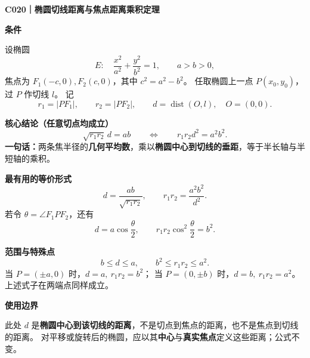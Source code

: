 \begin{statementbox}
\textbf{\textcolor{CStatement}{C020｜椭圆切线距离与焦点距离乘积定理}}

\medskip
\textbf{\textcolor{CStatement}{条件}}\par
设椭圆
\[
E:\quad \frac{x^2}{a^2}+\frac{y^2}{b^2}=1,\qquad a>b>0,
\]
焦点为 $F_1(-c,0),F_2(c,0)$，其中 $c^2=a^2-b^2$。
任取椭圆上一点 $P(x_0,y_0)$，过 $P$ 作切线 $l$。
记
\[
r_1=|PF_1|,\qquad r_2=|PF_2|,\qquad
 d=\operatorname{dist}(O,l),\quad O=(0,0).
\]

\textbf{\textcolor{CStatement}{核心结论（任意切点均成立）}}
\[
\boxed{\sqrt{r_1r_2}\,d=ab}\qquad\Longleftrightarrow\qquad
\boxed{r_1r_2d^2=a^2b^2}.
\]
\textbf{一句话：}两条焦半径的\textbf{几何平均数}，乘以\textbf{椭圆中心到切线的垂距}，等于半长轴与半短轴的乘积。

\medskip
\textbf{\textcolor{CStatement}{最有用的等价形式}}
\[
\boxed{d=\frac{ab}{\sqrt{r_1r_2}}},\qquad
\boxed{r_1r_2=\frac{a^2b^2}{d^2}}.
\]
若令 $\theta=\angle F_1PF_2$，还有
\[
\boxed{d=a\cos\frac{\theta}{2}},\qquad
\boxed{r_1r_2\cos^2\frac{\theta}{2}=b^2}.
\]

\textbf{\textcolor{CStatement}{范围与特殊点}}
\[
b\le d\le a,\qquad b^2\le r_1r_2\le a^2.
\]
当 $P=(\pm a,0)$ 时，$d=a,\ r_1r_2=b^2$；
当 $P=(0,\pm b)$ 时，$d=b,\ r_1r_2=a^2$。
上述式子在两端点同样成立。

\textbf{\textcolor{CStatement}{使用边界}}\par
此处 $d$ 是\textbf{椭圆中心到该切线的距离}，不是切点到焦点的距离，也不是焦点到切线的距离。
对平移或旋转后的椭圆，应以其\textbf{中心}与\textbf{真实焦点}定义这些距离；公式不变。
\end{statementbox}
